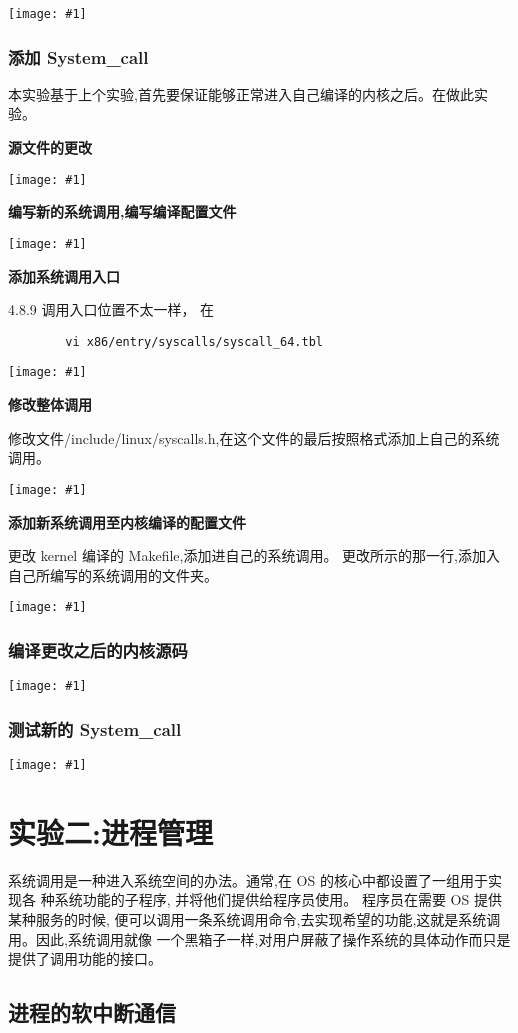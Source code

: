 \documentclass{article}
\newcommand{\incpng}[1]{\texttt{[image: \#1]}}
\begin{document}
\begin{CJK}{UTF8}{gkai}
\incpng{../v}

\subsubsection{添加 System\_call}
本实验基于上个实验,首先要保证能够正常进入自己编译的内核之后。在做此实验。

\textbf{源文件的更改}

\incpng{../newcall}

\textbf{编写新的系统调用,编写编译配置文件}

\incpng{../c}

\textbf{添加系统调用入口}

4.8.9 调用入口位置不太一样， 在
\begin{verbatim}
        vi x86/entry/syscalls/syscall_64.tbl
\end{verbatim}

\incpng{../entry}

\textbf{修改整体调用}

修改文件/include/linux/syscalls.h,在这个文件的最后按照格式添加上自己的系统调用。

\incpng{../linuxcall}

\textbf{添加新系统调用至内核编译的配置文件}

更改 kernel 编译的 Makefile,添加进自己的系统调用。
更改所示的那一行,添加入自己所编写的系统调用的文件夹。

\incpng{../core}

\subsubsection{编译更改之后的内核源码}
\incpng{../make}
\subsubsection{测试新的 System\_call}
\incpng{../test}


\clearpage
\section{实验二:进程管理}
系统调用是一种进入系统空间的办法。通常,在 OS 的核心中都设置了一组用于实现各
种系统功能的子程序,
并将他们提供给程序员使用。
程序员在需要 OS 提供某种服务的时候,
便可以调用一条系统调用命令,去实现希望的功能,这就是系统调用。因此,系统调用就像
一个黑箱子一样,对用户屏蔽了操作系统的具体动作而只是提供了调用功能的接口。

\subsection{进程的软中断通信}


\end{CJK}
\end{document}
